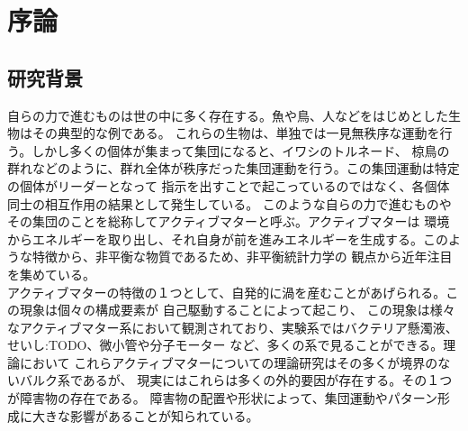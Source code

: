 \documentclass[/Users/ikedahajime/GitHub/reserch/master_report/thesis]{subfiles}
\begin{document}
\chapter{序論}

\section{研究背景}
自らの力で進むものは世の中に多く存在する。魚や鳥、人などをはじめとした生物はその典型的な例である。
これらの生物は、単独では一見無秩序な運動を行う。しかし多くの個体が集まって集団になると、イワシのトルネード、
椋鳥の群れなどのように、群れ全体が秩序だった集団運動を行う。この集団運動は特定の個体がリーダーとなって
指示を出すことで起こっているのではなく、各個体同士の相互作用の結果として発生している。
このような自らの力で進むものやその集団のことを総称してアクティブマターと呼ぶ。アクティブマターは
環境からエネルギーを取り出し、それ自身が前を進みエネルギーを生成する。このような特徴から、非平衡な物質であるため、非平衡統計力学の
観点から近年注目を集めている。\\%

アクティブマターの特徴の１つとして、自発的に渦を産むことがあげられる。この現象は個々の構成要素が
自己駆動することによって起こり、%
この現象は様々なアクティブマター系において観測されており、実験系ではバクテリア懸濁液、せいし:TODO、微小管や分子モーター
など、多くの系で見ることができる。理論において%
これらアクティブマターについての理論研究はその多くが境界のないバルク系であるが、
現実にはこれらは多くの外的要因が存在する。その１つが障害物の存在である。
障害物の配置や形状によって、集団運動やパターン形成に大きな影響があることが知られている。


\end{document}
